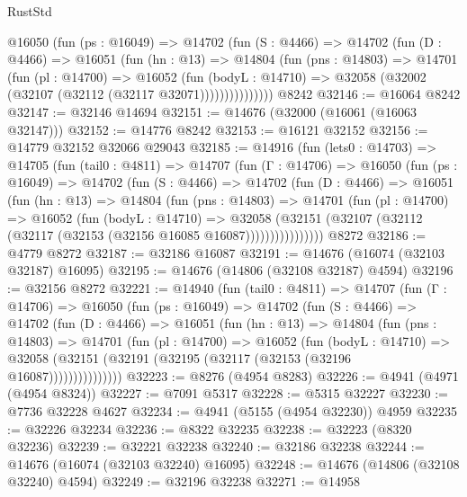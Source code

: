 \begin{lexlean}{RustStd}
\begin{coremodule}
          @16050
            (fun (ps : @16049) =>
            @14702
              (fun (S : @4466) =>
              @14702
                (fun (D : @4466) =>
                @16051
                  (fun (hn : @13) =>
                  @14804
                    (fun (pns : @14803) =>
                    @14701
                      (fun (pl : @14700) =>
                      @16052
                        (fun (bodyL : @14710) =>
                        @32058 (@32002 (@32107 (@32112 (@32117 @32071)))))))))))))))
    @8242
@32146 := @16064 @8242
@32147 := @32146 @14694
@32151 := @14676 (@32000 (@16061 (@16063 @32147)))
@32152 := @14776 @8242
@32153 := @16121 @32152
@32156 := @14779 @32152 @32066 @29043
@32185 := @14916
    (fun (lets0 : @14703) =>
    @14705
      (fun (tail0 : @4811) =>
      @14707
        (fun (Γ : @14706) =>
        @16050
          (fun (ps : @16049) =>
          @14702
            (fun (S : @4466) =>
            @14702
              (fun (D : @4466) =>
              @16051
                (fun (hn : @13) =>
                @14804
                  (fun (pns : @14803) =>
                  @14701
                    (fun (pl : @14700) =>
                    @16052
                      (fun (bodyL : @14710) =>
                      @32058
                        (@32151
                          (@32107 (@32112 (@32117 (@32153 (@32156 @16085 @16087))))))))))))))))
    @8272
@32186 := @4779 @8272
@32187 := @32186 @16087
@32191 := @14676 (@16074 (@32103 @32187) @16095)
@32195 := @14676 (@14806 (@32108 @32187) @4594)
@32196 := @32156 @8272
@32221 := @14940
    (fun (tail0 : @4811) =>
    @14707
      (fun (Γ : @14706) =>
      @16050
        (fun (ps : @16049) =>
        @14702
          (fun (S : @4466) =>
          @14702
            (fun (D : @4466) =>
            @16051
              (fun (hn : @13) =>
              @14804
                (fun (pns : @14803) =>
                @14701
                  (fun (pl : @14700) =>
                  @16052
                    (fun (bodyL : @14710) =>
                    @32058 (@32151 (@32191 (@32195 (@32117 (@32153 (@32196 @16087)))))))))))))))
@32223 := @8276 (@4954 @8283)
@32226 := @4941 (@4971 (@4954 @8324))
@32227 := @7091 @5317
@32228 := @5315 @32227
@32230 := @7736 @32228 @4627
@32234 := @4941 (@5155 (@4954 @32230)) @4959
@32235 := @32226 @32234
@32236 := @8322 @32235
@32238 := @32223 (@8320 @32236)
@32239 := @32221 @32238
@32240 := @32186 @32238
@32244 := @14676 (@16074 (@32103 @32240) @16095)
@32248 := @14676 (@14806 (@32108 @32240) @4594)
@32249 := @32196 @32238
@32271 := @14958

\end{coremodule}
\end{lexlean}
